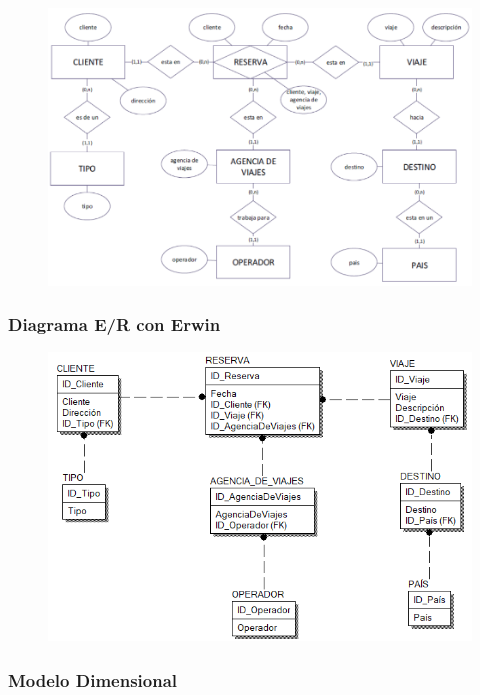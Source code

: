 \documentclass[12pt,letterpaper]{article}
\begin{document}
	\begin{figure}[htb]
		\begin{center}
			\includegraphics[width=11.5cm]{./IMAGENES/Ejercicio_2}
			
		\end{center}
	\end{figure}

\subsubsection{\textbf{Diagrama E/R con Erwin}}

	\begin{figure}[htb]
		\begin{center}
			\includegraphics[width=12cm]{./Imagenes/erwin_2}
			
		\end{center}
	\end{figure}

\newpage

\subsubsection{\textbf{Modelo Dimensional }}
\end{document}
